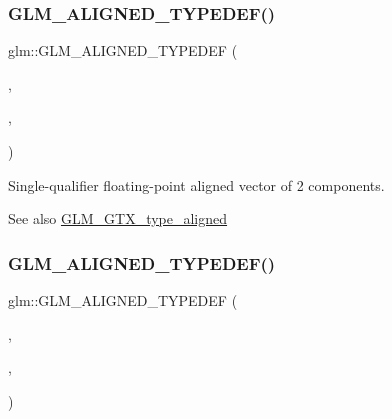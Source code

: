 \subsubsection{\texorpdfstring{G\+L\+M\+\_\+\+A\+L\+I\+G\+N\+E\+D\+\_\+\+T\+Y\+P\+E\+D\+E\+F()}{GLM\_ALIGNED\_TYPEDEF()}\hspace{0.1cm}{\footnotesize\ttfamily [148/209]}}
{\footnotesize\ttfamily glm\+::\+G\+L\+M\+\_\+\+A\+L\+I\+G\+N\+E\+D\+\_\+\+T\+Y\+P\+E\+D\+EF (\begin{DoxyParamCaption}\item[{\hyperlink{group__gtc__type__precision_gaabc3d7a259968a12108c052ff9265148}{fvec2}}]{,  }\item[{aligned\+\_\+fvec2}]{,  }\item[{8}]{ }\end{DoxyParamCaption})}

Single-\/qualifier floating-\/point aligned vector of 2 components. \begin{DoxySeeAlso}{See also}
\hyperlink{group__gtx__type__aligned}{G\+L\+M\+\_\+\+G\+T\+X\+\_\+type\+\_\+aligned} 
\end{DoxySeeAlso}
\mbox{\label{group__gtx__type__aligned_ga009afd727fd657ef33a18754d6d28f60}} 
\subsubsection{\texorpdfstring{G\+L\+M\+\_\+\+A\+L\+I\+G\+N\+E\+D\+\_\+\+T\+Y\+P\+E\+D\+E\+F()}{GLM\_ALIGNED\_TYPEDEF()}\hspace{0.1cm}{\footnotesize\ttfamily [149/209]}}
{\footnotesize\ttfamily glm\+::\+G\+L\+M\+\_\+\+A\+L\+I\+G\+N\+E\+D\+\_\+\+T\+Y\+P\+E\+D\+EF (\begin{DoxyParamCaption}\item[{\hyperlink{group__gtc__type__precision_gaf7cdc93898ec0c11f1cff54bd72d022b}{fvec3}}]{,  }\item[{aligned\+\_\+fvec3}]{,  }\item[{16}]{ }\end{DoxyParamCaption})}

